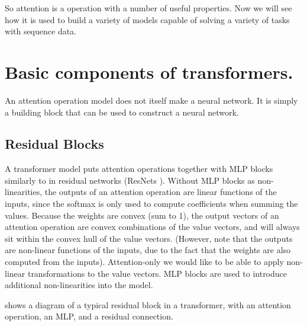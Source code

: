 So attention is a operation with a number of useful properties. Now we will see how it is used to build a variety of models capable of solving a variety of tasks with sequence data.

\section{Basic components of transformers.}

An attention operation model does not itself make a neural network. It is simply a building block that can be used to construct a neural network.

\subsection{Residual Blocks}

A transformer model puts attention operations together with MLP blocks similarly to in residual networks (ResNets \cite{resnet}). Without MLP blocks as non-linearities, the outputs of an attention operation are linear functions of the inputs, since the softmax is only used to compute coefficients when summing the values. Because the weights are convex (sum to 1), the output vectors of an attention operation are convex combinations of the value vectors, and will always sit within the convex hull of the value vectors. (However, note that the outputs are non-linear functions of the inputs, due to the fact that the weights are also computed from the inputs). Attention-only we would like to be able to apply non-linear transformations to the value vectors. MLP blocks are used to introduce additional non-linearities into the model.

 shows a diagram of a typical residual block in a transformer, with an attention operation, an MLP, and a residual connection.


